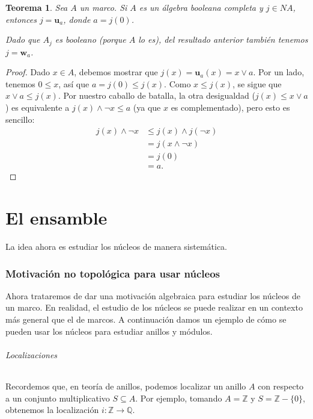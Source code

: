 \documentclass[12pt,letterpaper,titlepage]{article}
\newtheorem{thm}{Teorema}
\theoremstyle{definition}
\renewcommand\sup{\vee}
\renewcommand\inf{\wedge}
\newcommand\Z{\mathbb Z}
\newcommand\Q{\mathbb Q}
\newcommand\unuc[1]{\mathbf u_{#1}}
\newcommand\wnuc[1]{\mathbf w_{#1}}
\newcommand\<{\langle}
\renewcommand\>{\rangle}
\begin{document}
\begin{thm}
  Sea $A$ un marco.
  Si $A$ es un álgebra booleana completa y $j\in NA$,
  entonces $j=\unuc a$, donde $a=j(0)$.
  
  Dado que $A_j$ es booleano (porque $A$ lo es),
  del resultado anterior también tenemos $j=\wnuc a$.
\end{thm}
\begin{proof}
    Dado $x\in A$, debemos mostrar que $j(x)=\unuc a(x)=x\sup a$.
    Por un lado, tenemos $0\leq x$, así que $a=j(0)\leq j(x)$.
    Como $x\leq j(x)$, se sigue que $x\sup a\leq j(x)$.
    Por nuestro caballo de batalla, la otra desigualdad
    ($j(x)\leq x\sup a$) es equivalente a $j(x)\inf \neg x\leq a$
    (ya que $x$ es complementado), pero esto es sencillo:
    \begin{align*}
        j(x)\inf\neg x
        &\leq j(x)\inf j(\neg x) \\
        &= j(x\inf\neg x) \\
        &= j(0) \\
        &= a.
    \end{align*}
\end{proof}

\part{El ensamble}

La idea ahora es estudiar los núcleos de manera sistemática.


\section{Motivación no topológica para usar núcleos}

Ahora trataremos de dar una motivación algebraica para
estudiar los núcleos de un marco.
En realidad, el estudio de los núcleos se puede realizar
en un contexto más general que el de marcos.
A continuación damos un ejemplo de cómo se pueden usar
los núcleos para estudiar anillos y módulos.

\paragraph{Localizaciones}
Recordemos que, en teoría de anillos,
podemos localizar un anillo $A$ con respecto a un conjunto
multiplicativo $S\subseteq A$.
Por ejemplo, tomando $A=\Z$ y $S=\Z-\{0\}$,
obtenemos la localización $i:\Z\to\Q$.
\end{document}
